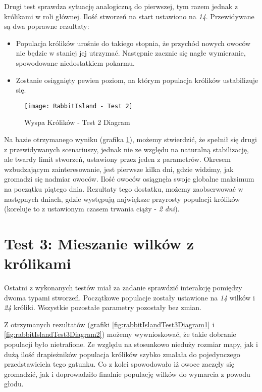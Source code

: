 \par Drugi test sprawdza sytuację analogiczną do pierwszej, tym razem jednak z królikami w roli głównej. Ilość stworzeń na start ustawiono na \emph{14}. Przewidywane są dwa poprawne rezultaty:
\begin{itemize}
	\item Populacja królików urośnie do takiego stopnia, że przychód nowych owoców nie będzie w staniej jej utrzymać. Następnie zacznie się nagłe wymieranie, spowodowane niedostatkiem pokarmu.
	\item Zostanie osiągnięty pewien poziom, na którym populacja królików ustabilizuje się.
\end{itemize}

\begin{figure}
	\texttt{[image: RabbitIsland - Test 2]}
	\caption{Wyspa Królików - Test 2 Diagram}
	\label{fig:rabbitIslandTest2Diagram1}
\end{figure}

\par Na bazie otrzymanego wyniku (grafika \ref{fig:rabbitIslandTest2Diagram1}), możemy stwierdzić, że spełnił się drugi z przewidywanych scenariuszy, jednak nie ze względu na naturalną stabilizację, ale twardy limit stworzeń, ustawiony przez jeden z parametrów. Okresem wzbudzającym zainteresowanie, jest pierwsze kilka dni, gdzie widzimy, jak gromadzi się nadmiar owoców. Ilość owoców osiągnęła swoje globalne maksimum na początku piątego dnia. Rezultaty tego dostatku, możemy zaobserwować w następnych dniach, gdzie występują największe przyrosty populacji królików (koreluje to z ustawionym czasem trwania ciąży - \emph{2 dni}).

\section{Test 3: Mieszanie wilków z królikami}

\par Ostatni z wykonanych testów miał za zadanie sprawdzić interakcję pomiędzy dwoma typami stworzeń. Początkowe populacje zostały ustawione na \emph{14} wilków i \emph{24} króliki. Wszystkie pozostałe parametry pozostały bez zmian.

\par Z otrzymanych rezultatów (grafiki \ref{fig:rabbitIslandTest3Diagram1} i \ref{fig:rabbitIslandTest3Diagram2}) możemy wywnioskować, że takie dobranie populacji było nietrafione. Ze względu na stosunkowo nieduży rozmiar mapy, jak i dużą ilość drapieżników populacja królików szybko zmalała do pojedynczego przedstawiciela tego gatunku. Co z kolei spowodowało iż owoce zaczęły się gromadzić, jak i doprowadziło finalnie populację wilków do wymarcia z powodu głodu.

